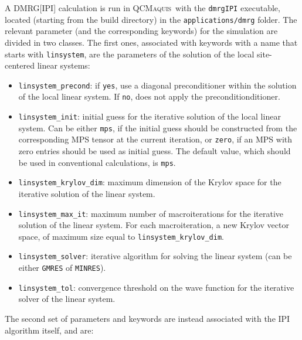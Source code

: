 \documentclass[bibliography=totoc,12pt,a4paper]{scrartcl}
\newcommand{\qcm}{\textsc{QCMaquis}}
\begin{document}
A DMRG[IPI] calculation is run in \qcm\ with the \texttt{dmrgIPI} executable, located (starting from the build directory) in the \texttt{applications/dmrg} folder.
The relevant parameter (and the corresponding keywords) for the simulation are divided in two classes.
The first ones, associated with keywords with a name that starts with \texttt{linsystem}, are the parameters of the solution of the local site-centered linear systems:

\begin{itemize}
  \item \texttt{linsystem\_precond}: if \texttt{yes}, use a diagonal preconditioner within the solution of the local linear system. If \texttt{no}, does not apply the preconditionditioner.
  \item \texttt{linsystem\_init}: initial guess for the iterative solution of the local linear system.
  Can be either \texttt{mps}, if the initial guess should be constructed from the corresponding MPS tensor at the current iteration, or \texttt{zero}, if an MPS with zero entries should be used as initial guess.
  The default value, which should be used in conventional calculations, is \texttt{mps}.
  \item \texttt{linsystem\_krylov\_dim}: maximum dimension of the Krylov space for the iterative solution of the linear system.
  \item \texttt{linsystem\_max\_it}: maximum number of macroiterations for the iterative solution of the linear system. For each macroiteration, a new Krylov vector space, of maximum size equal to \texttt{linsystem\_krylov\_dim}.
  \item \texttt{linsystem\_solver}: iterative algorithm for solving the linear system (can be either \texttt{GMRES} of \texttt{MINRES}).
  \item \texttt{linsystem\_tol}: convergence threshold on the wave function for the iterative solver of the linear system.
\end{itemize}

The second set of parameters and keywords are instead associated with the IPI algorithm itself, and are:
\end{document}
